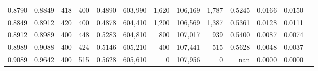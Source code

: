 \begin{tabular}{rrrrrrrrrrrrr}
0.8790 & 0.8849 &    418 & 400 &                                     0.4890 & 603,990 &   1,620 & 106,169 &   1,787 & 0.5245 & 0.0166 & 0.0150 \\
0.8849 & 0.8912 &    420 & 400 &                                     0.4878 & 604,410 &   1,200 & 106,569 &   1,387 & 0.5361 & 0.0128 & 0.0111 \\
0.8912 & 0.8989 &    400 & 448 &                                     0.5283 & 604,810 &     800 & 107,017 &     939 & 0.5400 & 0.0087 & 0.0074 \\
0.8989 & 0.9088 &    400 & 424 &                                     0.5146 & 605,210 &     400 & 107,441 &     515 & 0.5628 & 0.0048 & 0.0037 \\
0.9089 & 0.9642 &    400 & 515 &                                     0.5628 & 605,610 &       0 & 107,956 &       0 &    nan & 0.0000 & 0.0000 \\
\bottomrule
\end{tabular}
